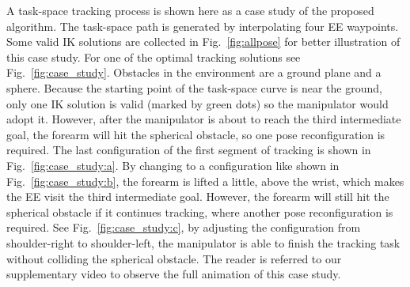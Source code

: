 \documentclass[letterpaper, 10 pt, conference]{ieeeconf}  %
\begin{document}
A task-space tracking process is shown here as a case study of the proposed algorithm. 
The task-space path is generated by interpolating four EE waypoints. 
Some valid IK solutions are collected in Fig.~\ref{fig:allpose} for better illustration of this case study. 
For one of the optimal tracking solutions see Fig.~\ref{fig:case_study}. 
Obstacles in the environment are a ground plane and a sphere. 
Because the starting point of the task-space curve is near the ground, only one IK solution is valid (marked by green dots) so the manipulator would adopt it. 
However, after the manipulator is about to reach the third intermediate goal, the forearm will hit the spherical obstacle, so one pose reconfiguration is required. 
The last configuration of the first segment of tracking is shown in Fig.~\ref{fig:case_study:a}. 
By changing to a configuration like shown in Fig.~\ref{fig:case_study:b}, the forearm is lifted a little, above the wrist, which makes the EE visit the third intermediate goal. However, the forearm will still hit the spherical obstacle if it continues tracking, where another pose reconfiguration is required. 
See Fig.~\ref{fig:case_study:c}, by adjusting the configuration from shoulder-right to shoulder-left, the manipulator is able to finish the tracking task without colliding the spherical obstacle.
The reader is referred to our supplementary video to observe the full animation of this case study. 








\end{document}
